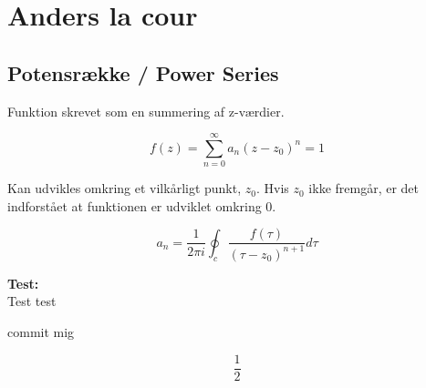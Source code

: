 \chapter{Anders la cour}

\section{Potensrække / Power Series}

Funktion skrevet som en summering af z-værdier. 


\begin{equation*}
       f(z)=\sum_{n=0}^{\infty} a_{n}(z-z_0)^{n} = 1  
\end{equation*}

Kan udvikles omkring et vilkårligt punkt, \(z_0\).
Hvis \(z_0\) ikke fremgår, er det indforstået at funktionen er udviklet omkring 0. 


\begin{equation*}
a_n = \frac{1}{2\pi i} \oint_c \frac{f(\tau)}{(\tau-z_0)^{n+1}} d\tau
\end{equation*}


\begin{tcolorbox}[colback=white!5!white,colframe=blue!75!black]
  \textbf{Test:}\\
Test test

commit mig

\end{tcolorbox}




$$ \frac{1}{2} $$